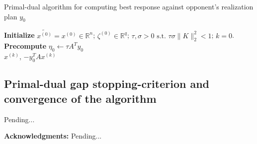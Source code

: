 \documentclass[a4paper,10pt,journal]{IEEEtran}
\begin{document}
\begin{algorithm}[htb]
\caption{Primal-dual algorithm for computing best response against opponent's realization plan $y_0$}
\textbf{Initialize} $\tilde{x^{(0)}} = x^{(0)} \in \mathbb{R}^n$; $\zeta^{(0)} \in \mathbb{R}^{q}$;
$\tau, \sigma > 0 \text{ s.t. }\tau\sigma \|K\|_2^2 < 1$; $k = 0$.\\
\textbf{Precompute} $\eta_0 \leftarrow \tau A^Ty_0$\\
 \Return $x^{(k)}$, $-y_0^TAx^{(k)}$
\label{Tab:pseudocode_pb}
\end{algorithm}

\subsection{Primal-dual gap stopping-criterion and convergence of the algorithm}
Pending...

\medskip \noindent
\textbf{Acknowledgments:}
Pending...

 
\end{document}

